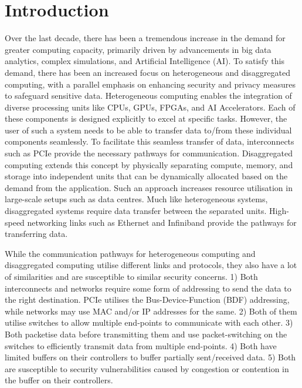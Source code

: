 
\chapter{Introduction}
\label{ch:Introduction}

Over the last decade, there has been a tremendous increase in the demand for greater computing capacity, primarily driven by advancements in big data analytics, complex simulations, and Artificial Intelligence (AI). 
To satisfy this demand, there has been an increased focus on heterogeneous and disaggregated computing, with a parallel emphasis on enhancing security and privacy measures to safeguard sensitive data.
Heterogeneous computing enables the integration of diverse processing units like CPUs, GPUs, FPGAs, and AI Accelerators. 
Each of these components is designed explicitly to excel at specific tasks. 
However, the user of such a system needs to be able to transfer data to/from these individual components seamlessly. 
To facilitate this seamless transfer of data, interconnects such as PCIe provide the necessary pathways for communication.
Disaggregated computing extends this concept by physically separating compute, memory, and storage into independent units that can be dynamically allocated based on the demand from the application. Such an approach increases resource utilisation in large-scale setups such as data centres. Much like heterogeneous systems, disaggregated systems require data transfer between the separated units. High-speed networking links such as Ethernet and Infiniband provide the pathways for transferring data.

While the communication pathways for heterogeneous computing and disaggregated computing utilise different links and protocols, they also have a lot of similarities and are susceptible to similar security concerns. 
1) Both interconnects and networks require some form of addressing to send the data to the right destination. PCIe utilises the Bus-Device-Function (BDF) addressing, while networks may use MAC and/or IP addresses for the same. 
2) Both of them utilise switches to allow multiple end-points to communicate with each other. 
3) Both packetise data before transmitting them and use packet-switching on the switches to efficiently transmit data from multiple end-points. 
4) Both have limited buffers on their controllers to buffer partially sent/received data. 
5) Both are susceptible to security vulnerabilities caused by congestion or contention in the buffer on their controllers.

